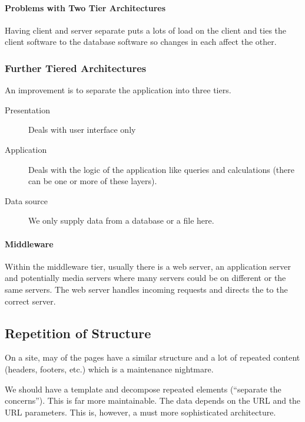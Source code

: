 \paragraph{Problems with Two Tier Architectures}\label{par:problems_with_two_tier_architectures}

Having client and server separate puts a lots of load on the client  and ties the client software to the database software so changes in each affect the other.

\subsubsection{Further Tiered Architectures}\label{ssub:further_tiered_architecures}

An improvement is to separate the application into three tiers.
\begin{description}
    \item[Presentation] Deals with user interface only
    \item[Application] Deals with the logic of the application like queries and calculations (there can be one or more of these layers).
    \item[Data source] We only supply data from a database or a file here.
\end{description}

\paragraph{Middleware}\label{par:middleware}

Within the middleware tier, usually there is a web server, an application server and potentially media servers where many servers could be on different or the same servers.
The web server handles incoming requests and directs the to the correct server.

\subsection{Repetition of Structure}\label{sub:repetition_of_structure}

On a site, may of the pages have a similar structure and a lot of repeated content (headers, footers, etc.) which is a maintenance nightmare.

We should have a template and decompose repeated elements (``separate the concerns'').
This is far more maintainable.
The data depends on the URL and the URL parameters.
This is, however, a must more sophisticated architecture.


